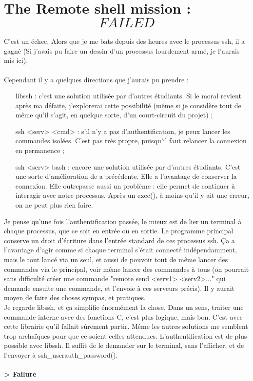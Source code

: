 \chapter[Remote shell FAILED]{The Remote shell mission : \[FAILED\]}
C'est un échec. Alors que je me bats depuis des heures avec le processus ssh, il a gagné (Si j'avais pu faire un dessin d'un processus lourdement armé, je l'aurais mis ici).
\\\\
Cependant il y a quelques directions que j'aurais pu prendre :
\\\begin{itemize}
\item[libssh :] c'est une solution utilisée par d'autres étudiants. Si le moral revient après ma défaite, j'explorerai cette possibilité (même si je considère tout de même qu'il s'agit, en quelque sorte, d'un court-circuit du projet) ;
\item[ssh <serv> <cmd> :] s'il n'y a pas d'authentification, je peux lancer les commandes isolées. C'est pas très propre, puisqu'il faut relancer la connexion en permanence ;
\item[ssh <serv> bash :] encore une solution utilisée par d'autres étudiants. C'est une sorte d'amélioration de a précédente. Elle a l'avantage de conserver la connexion. Elle outrepasse aussi un problème : elle permet de continuer à interagir avec notre processus. Après un exec(), à moins qu'il y ait une erreur, on ne peut plus rien faire.
\\\end{itemize}
Je pense qu'une fois l'authentification passée, le mieux est de lier un terminal à chaque processus, que ce soit en entrée ou en sortie. Le programme principal conserve un droit d'écriture dans l'entrée standard de ces processus ssh. Ça a l'avantage d'agir comme si chaque terminal s'était connecté indépendamment, mais le tout lancé via un seul, et aussi de pouvoir tout de même lancer des commandes via le principal, voir même lancer des commandes à tous (on pourrait sans difficulté créer une commande "remote send <serv1> <serv2>..." qui demande ensuite une commande, et l'envoie à ces serveurs précis). Il y aurait moyen de faire des choses sympas, et pratiques.
\\Je regarde libssh, et ça simplifie énormément la chose. Dans un sens, traiter une commande interne avec des fonctions C, c'est plus logique, mais bon. C'est avec cette librairie qu'il fallait sûrement partir. Même les autres solutions me semblent trop archaïques pour que ce soient celles attendues. L'authentification est de plus possible avec libssh. Il suffit de le demander sur le terminal, sans l'afficher, et de l'envoyer à ssh\_userauth\_password().
\\\\
\textbf{> Failure}